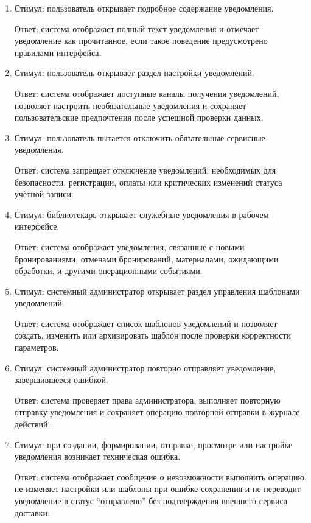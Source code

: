 \documentclass[12pt,a4paper]{article}
\begin{document}
\begin{enumerate}
		\item Стимул: пользователь открывает подробное содержание уведомления.
		
		Ответ: система отображает полный текст уведомления и отмечает уведомление
		как прочитанное, если такое поведение предусмотрено правилами интерфейса.
		
		\item Стимул: пользователь открывает раздел настройки уведомлений.
		
		Ответ: система отображает доступные каналы получения уведомлений, позволяет
		настроить необязательные уведомления и сохраняет пользовательские предпочтения
		после успешной проверки данных.
		
		\item Стимул: пользователь пытается отключить обязательные сервисные уведомления.
		
		Ответ: система запрещает отключение уведомлений, необходимых для безопасности,
		регистрации, оплаты или критических изменений статуса учётной записи.
		
		\item Стимул: библиотекарь открывает служебные уведомления в рабочем интерфейсе.
		
		Ответ: система отображает уведомления, связанные с новыми бронированиями,
		отменами бронирований, материалами, ожидающими обработки, и другими
		операционными событиями.
		
		\item Стимул: системный администратор открывает раздел управления шаблонами
		уведомлений.
		
		Ответ: система отображает список шаблонов уведомлений и позволяет создать,
		изменить или архивировать шаблон после проверки корректности параметров.
		
		\item Стимул: системный администратор повторно отправляет уведомление,
		завершившееся ошибкой.
		
		Ответ: система проверяет права администратора, выполняет повторную отправку
		уведомления и сохраняет операцию повторной отправки в журнале действий.
		
		\item Стимул: при создании, формировании, отправке, просмотре или настройке
		уведомления возникает техническая ошибка.
		
		Ответ: система отображает сообщение о невозможности выполнить операцию,
		не изменяет настройки или шаблоны при ошибке сохранения и не переводит
		уведомление в статус ``отправлено'' без подтверждения внешнего сервиса доставки.
	\end{enumerate}
	
\end{document}
